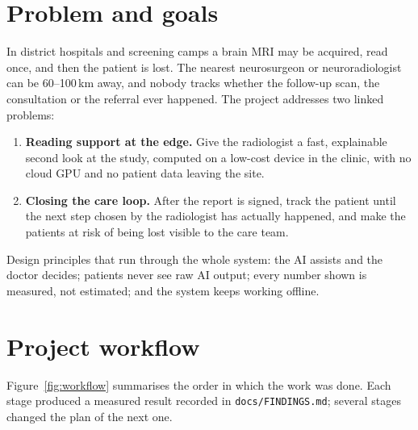\documentclass[11pt,a4paper]{article}
\begin{document}
\tableofcontents
\newpage

\section{Problem and goals}
In district hospitals and screening camps a brain MRI may be acquired, read once, and then the patient is lost. The
nearest neurosurgeon or neuroradiologist can be 60--100\,km away, and nobody tracks whether the follow-up scan, the
consultation or the referral ever happened. The project addresses two linked problems:
\begin{enumerate}
\item \textbf{Reading support at the edge.} Give the radiologist a fast, explainable second look at the study,
computed on a low-cost device in the clinic, with no cloud GPU and no patient data leaving the site.
\item \textbf{Closing the care loop.} After the report is signed, track the patient until the next step chosen by the
radiologist has actually happened, and make the patients at risk of being lost visible to the care team.
\end{enumerate}
Design principles that run through the whole system: the AI assists and the doctor decides; patients never see raw
AI output; every number shown is measured, not estimated; and the system keeps working offline.

\section{Project workflow}
Figure~\ref{fig:workflow} summarises the order in which the work was done. Each stage produced a measured result
recorded in \texttt{docs/FINDINGS.md}; several stages changed the plan of the next one.
\end{document}
